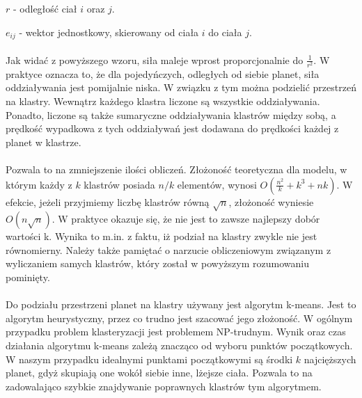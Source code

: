 $ r $ - odległość ciał $i$ oraz $j$. 

$ e_{ij} $ - wektor jednostkowy, skierowany od ciała $i$ do ciała $j$. 

\paragraph{}

Jak widać z powyższego wzoru, siła maleje wprost proporcjonalnie do $ \frac {1}{r^2} $. W praktyce oznacza to, że dla pojedyńczych, odległych od siebie planet, siła oddziaływania jest pomijalnie niska. W związku z tym można podzielić przestrzeń na klastry. Wewnątrz każdego klastra liczone są wszystkie oddziaływania. Ponadto, liczone są także sumaryczne oddziaływania klastrów między sobą, a prędkość wypadkowa z tych oddziaływań jest dodawana do prędkości każdej z planet w klastrze.

\paragraph{}
Pozwala to na zmniejszenie ilości obliczeń. Złożoność teoretyczna dla modelu, w którym każdy z $k$ klastrów posiada $n/k$ elementów, wynosi $O(\frac{n^2}{k} + k^3 + nk)$. W efekcie, jeżeli przyjmiemy liczbę klastrów równą $\sqrt{n}$, złożoność wyniesie $O(n\sqrt{n})$. W praktyce okazuje się, że nie jest to zawsze najlepszy dobór wartości k. Wynika to m.in. z faktu, iż podział na klastry zwykle nie jest równomierny. Należy także pamiętać o narzucie obliczeniowym związanym z wyliczaniem samych klastrów, który został w powyższym rozumowaniu pominięty.

\paragraph{}
Do podziału przestrzeni planet na klastry używany jest algorytm k-means. Jest to algorytm heurystyczny, przez co trudno jest szacować jego złożoność. W ogólnym przypadku problem klasteryzacji jest problemem NP-trudnym. Wynik oraz czas działania algorytmu k-means zależą znacząco od wyboru punktów początkowych. W naszym przypadku idealnymi punktami początkowymi są środki $k$ najcięższych planet, gdyż skupiają one wokół siebie inne, lżejsze ciała. Pozwala to na zadowalająco szybkie znajdywanie poprawnych klastrów tym algorytmem.
